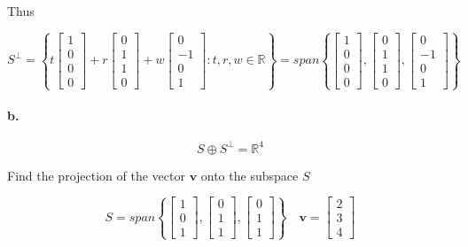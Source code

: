 \documentclass{report}
\begin{document}
Thus 

$$
S^\perp = \left\{ t \begin{bmatrix} 1 \\ 0 \\ 0 \\ 0 \end{bmatrix} + r \begin{bmatrix} 0 \\ 1 \\ 1 \\ 0 \end{bmatrix} + w \begin{bmatrix} 0 \\ -1 \\ 0 \\ 1 \end{bmatrix}: t, r, w \in \mathbb{R} \right\} = span \left\{ \begin{bmatrix} 1 \\ 0 \\ 0 \\ 0 \end{bmatrix}, \begin{bmatrix} 0 \\ 1 \\ 1 \\ 0 \end{bmatrix}, \begin{bmatrix} 0 \\ -1 \\ 0 \\ 1 \end{bmatrix} \right\}
$$

\paragraph{b.} 

$$
S \oplus S^\perp = \mathbb{R}^4
$$

\begin{tcolorbox}[colframe = lightred]
	Find the projection of the vector $\bm{v}$ onto the subspace $S$
	
	$$
	S = span \left\{ \begin{bmatrix} 1 \\ 0 \\ 1 \end{bmatrix}, \begin{bmatrix} 0 \\ 1 \\ 1 \end{bmatrix}, \begin{bmatrix} 0 \\1 \\ 1 \end{bmatrix} \right\} \quad \bm{v} = \begin{bmatrix} 2 \\ 3 \\ 4 \end{bmatrix}
	$$
\end{tcolorbox}
\end{document}
